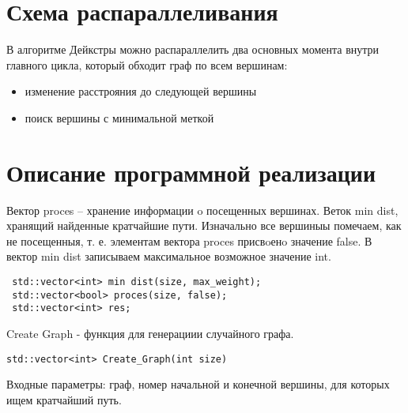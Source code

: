 \documentclass{report}
\begin{document}
\newpage

\section*{Схема распараллеливания}
В алгоритме Дейкстры можно распараллелить два основных момента внутри главного цикла, который обходит граф по всем вершинам:
\begin{itemize}
\item изменение расстрояния до следующей вершины
\item поиск вершины с минимальной меткой
\end{itemize}
\newpage

\section*{Описание программной реализации}
Вектор proces – хранение информации o посещенных вершинах.
Веток min dist, хранящий найденные кратчайшие пути. 
Изначально все вершиныы помечаем, как не посещенныя, т. е. элементам вектора proces присвoенo значение false. В вектор min dist записываем  максимальное возможное значение int.
\begin{lstlisting}
 std::vector<int> min dist(size, max_weight);
 std::vector<bool> proces(size, false);
 std::vector<int> res;
\end{lstlisting}
\par Create Graph - функция для генерациии случайного графа.
\begin{lstlisting}
std::vector<int> Create_Graph(int size)
\end{lstlisting}

\par Входные параметры: граф, номер начальной и конечной вершины, для которых ищем кратчайший путь.
\end{document}
